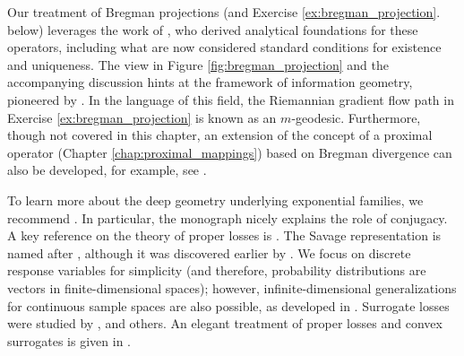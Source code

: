 Our treatment of Bregman projections (and Exercise \ref{ex:bregman_projection}.
below) leverages the work of \cite{bauschke1997legendre}, who derived analytical
foundations for these operators, including what are now considered standard
conditions for existence and uniqueness. The view in Figure
\ref{fig:bregman_projection} and the accompanying discussion hints at the
framework of information geometry, pioneered by \cite{amari2000methods}. In the
language of this field, the Riemannian gradient flow path in Exercise
\ref{ex:bregman_projection} is known as an $m$-geodesic. Furthermore, though not
covered in this chapter, an extension of the concept of a proximal operator
(Chapter \ref{chap:proximal_mappings}) based on Bregman divergence can also be
developed, for example, see \cite{censor1992proximal, teboulle1992entropic,
  chen1993convergence, eckstein1993nonlinear}.

To learn more about the deep geometry underlying exponential families, we 
recommend \cite{brown1986fundamentals, wainwright2008graphical,
  barndorff2014information, efron2022exponential}. In particular, the monograph 
\cite{wainwright2008graphical} nicely explains the role of conjugacy. A key
reference on the theory of proper losses is \cite{gneiting2007strictly}. The
Savage representation is named after \cite{savage1971elicitation}, although it was 
discovered earlier by \cite{mccarthy1956measures}. We focus on discrete response
variables for simplicity (and therefore, probability distributions are vectors in
finite-dimensional spaces); however, infinite-dimensional generalizations for
continuous sample spaces are also possible, as developed in 
\cite{hendrickson1971proper, gneiting2007strictly, ovcharov2018proper}. 
Surrogate losses were studied by \cite{reid2010composite,
  agarwal2014surrogate, blondel2020learning, martins2022sparse}, 
and others. An elegant treatment of proper losses and convex surrogates is
given in \cite{duchi2026lecture}.        

\clearpage

